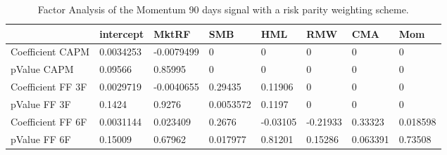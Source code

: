 \begin{table}[H]
\centering
\begin{tabular}{llllllll}
\hline& intercept & MktRF & SMB & HML & RMW & CMA & Mom \\ 
\hline 
Coefficient CAPM & 0.0034253 & -0.0079499 & 0 & 0 & 0 & 0 & 0 \\ 
pValue CAPM & 0.09566 & 0.85995 & 0 & 0 & 0 & 0 & 0 \\ 
Coefficient FF 3F & 0.0029719 & -0.0040655 & 0.29435 & 0.11906 & 0 & 0 & 0 \\ 
pValue FF 3F & 0.1424 & 0.9276 & 0.0053572 & 0.1197 & 0 & 0 & 0 \\ 
Coefficient FF 6F & 0.0031144 & 0.023409 & 0.2676 & -0.03105 & -0.21933 & 0.33323 & 0.018598 \\ 
pValue FF 6F & 0.15009 & 0.67962 & 0.017977 & 0.81201 & 0.15286 & 0.063391 & 0.73508 \\ 
\hline
\end{tabular}
\caption{Factor Analysis of the Momentum 90 days signal with a risk parity weighting scheme.}
\label{MOM90RP_FACTOR}
\end{table}